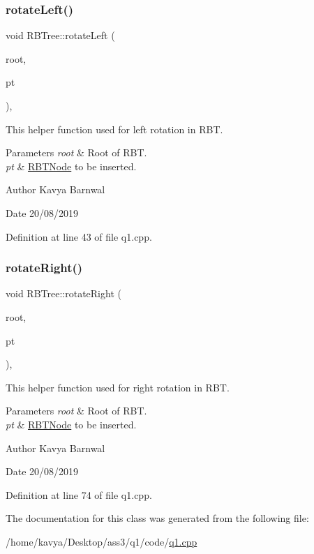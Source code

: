 \subsubsection{\texorpdfstring{rotate\+Left()}{rotateLeft()}}
{\footnotesize\ttfamily void R\+B\+Tree\+::rotate\+Left (\begin{DoxyParamCaption}\item[{\hyperlink{struct_r_b_t_node}{R\+B\+T\+Node} $\ast$\&}]{root,  }\item[{\hyperlink{struct_r_b_t_node}{R\+B\+T\+Node} $\ast$\&}]{pt }\end{DoxyParamCaption})\hspace{0.3cm}{\ttfamily [inline]}, {\ttfamily [protected]}}

This helper function used for left rotation in R\+BT. 
\begin{DoxyParams}{Parameters}
{\em root} & Root of R\+BT. \\
\hline
{\em pt} & \hyperlink{struct_r_b_t_node}{R\+B\+T\+Node} to be inserted. \\
\hline
\end{DoxyParams}
\begin{DoxyAuthor}{Author}
Kavya Barnwal 
\end{DoxyAuthor}
\begin{DoxyDate}{Date}
20/08/2019 
\end{DoxyDate}


Definition at line 43 of file q1.\+cpp.

\mbox{\label{class_r_b_tree_a9843ddcab67030b508032eeb991d4714}} 
\subsubsection{\texorpdfstring{rotate\+Right()}{rotateRight()}}
{\footnotesize\ttfamily void R\+B\+Tree\+::rotate\+Right (\begin{DoxyParamCaption}\item[{\hyperlink{struct_r_b_t_node}{R\+B\+T\+Node} $\ast$\&}]{root,  }\item[{\hyperlink{struct_r_b_t_node}{R\+B\+T\+Node} $\ast$\&}]{pt }\end{DoxyParamCaption})\hspace{0.3cm}{\ttfamily [inline]}, {\ttfamily [protected]}}

This helper function used for right rotation in R\+BT. 
\begin{DoxyParams}{Parameters}
{\em root} & Root of R\+BT. \\
\hline
{\em pt} & \hyperlink{struct_r_b_t_node}{R\+B\+T\+Node} to be inserted. \\
\hline
\end{DoxyParams}
\begin{DoxyAuthor}{Author}
Kavya Barnwal 
\end{DoxyAuthor}
\begin{DoxyDate}{Date}
20/08/2019 
\end{DoxyDate}


Definition at line 74 of file q1.\+cpp.



The documentation for this class was generated from the following file\+:\begin{DoxyCompactItemize}
\item 
/home/kavya/\+Desktop/ass3/q1/code/\hyperlink{q1_8cpp}{q1.\+cpp}\end{DoxyCompactItemize}
